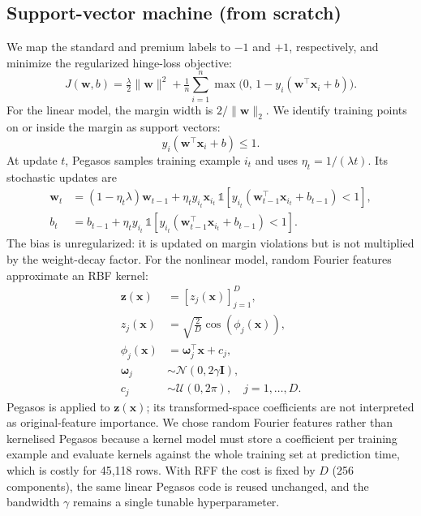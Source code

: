 \documentclass[10pt,twocolumn,a4paper]{article}
\begin{document}
\subsection{Support-vector machine (from scratch)}
We map the standard and premium labels to $-1$ and $+1$, respectively,
and minimize the regularized hinge-loss objective:
\begin{equation}
  J(\mathbf{w},b)=\tfrac{\lambda}{2}\lVert\mathbf{w}\rVert^{2}
  +\tfrac{1}{n}\sum_{i=1}^{n}\max\!\big(0,\,1-y_i(\mathbf{w}^{\top}\mathbf{x}_i+b)\big).
\end{equation}
For the linear model, the margin width is $2/\lVert\mathbf{w}\rVert_2$.
We identify training points on or inside the margin as support vectors:
\begin{equation}
  y_i(\mathbf{w}^{\top}\mathbf{x}_i+b)\leq 1.
\end{equation}
At update $t$, Pegasos samples training example $i_t$ and uses
$\eta_t=1/(\lambda t)$. Its stochastic updates are
\begin{align}
  \mathbf{w}_t &= (1-\eta_t\lambda)\mathbf{w}_{t-1}
    +\eta_t y_{i_t}\mathbf{x}_{i_t}\,
      \mathbb{1}\!\left[y_{i_t}(\mathbf{w}_{t-1}^{\top}\mathbf{x}_{i_t}
      +b_{t-1})<1\right],\\
  b_t &= b_{t-1}+\eta_t y_{i_t}\,
      \mathbb{1}\!\left[y_{i_t}(\mathbf{w}_{t-1}^{\top}\mathbf{x}_{i_t}
      +b_{t-1})<1\right].
\end{align}
The bias is unregularized: it is updated on margin violations but is not
multiplied by the weight-decay factor. For the nonlinear model, random
Fourier features approximate an RBF kernel:
\begin{equation}
  \begin{aligned}
    \mathbf{z}(\mathbf{x}) &= [z_j(\mathbf{x})]_{j=1}^{D},\\
    z_j(\mathbf{x}) &= \sqrt{\tfrac{2}{D}}\cos(\phi_j(\mathbf{x})),\\
    \phi_j(\mathbf{x}) &= \boldsymbol{\omega}_j^{\top}\mathbf{x}+c_j,\\
    \boldsymbol{\omega}_j &\sim \mathcal{N}(0,2\gamma\mathbf{I}),\\
    c_j &\sim \mathcal{U}(0,2\pi), \quad j=1,\ldots,D.
  \end{aligned}
\end{equation}
Pegasos is applied to $\mathbf{z}(\mathbf{x})$; its transformed-space
coefficients are not interpreted as original-feature importance.
We chose random Fourier features rather than kernelised Pegasos because
a kernel model must store a coefficient per training example and
evaluate kernels against the whole training set at prediction time,
which is costly for 45,118 rows. With RFF the cost is fixed by $D$
(256 components), the same linear Pegasos code is reused unchanged, and
the bandwidth $\gamma$ remains a single tunable hyperparameter.
\end{document}
